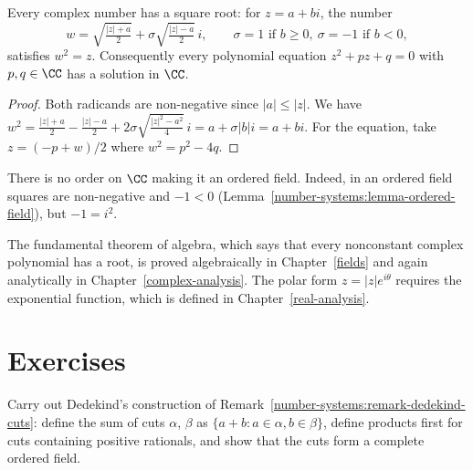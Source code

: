 \begin{proposition}\label{number-systems:proposition-complex-square-roots}
Every complex number has a square root: for $z = a + bi$, the number
\[
w = \sqrt{\tfrac{|z| + a}{2}} + \sigma \sqrt{\tfrac{|z| - a}{2}}\, i,
\qquad \sigma = 1 \text{ if } b \geq 0, \ \sigma = -1 \text{ if } b < 0,
\]
satisfies $w^2 = z$. Consequently every polynomial equation $z^2 + pz + q = 0$ with
$p, q \in \CC$ has a solution in $\CC$.
\end{proposition}

\begin{proof}
Both radicands are non-negative since $|a| \leq |z|$. We have
$w^2 = \frac{|z| + a}{2} - \frac{|z| - a}{2} + 2\sigma\sqrt{\frac{|z|^2 - a^2}{4}}\, i
= a + \sigma |b| i = a + bi$. For the equation, take
$z = (-p + w)/2$ where $w^2 = p^2 - 4q$.
\end{proof}

\begin{counterexample}\label{number-systems:counterexample-complex-not-ordered}
There is no order on $\CC$ making it an ordered field. Indeed, in an ordered
field squares are non-negative and $-1 < 0$
(Lemma~\ref{number-systems:lemma-ordered-field}), but $-1 = i^2$.
\end{counterexample}

\begin{remark}\label{number-systems:remark-complex-later}
The fundamental theorem of algebra, which says that every nonconstant complex
polynomial has a root, is proved algebraically in Chapter~\ref{fields} and again
analytically in Chapter~\ref{complex-analysis}. The polar form
$z = |z| e^{i\theta}$ requires the exponential function, which is defined in
Chapter~\ref{real-analysis}.
\end{remark}

\section{Exercises}\label{number-systems:section-exercises}

\begin{exercise}\label{number-systems:exercise-dedekind}
Carry out Dedekind's construction of Remark~\ref{number-systems:remark-dedekind-cuts}:
define the sum of cuts $\alpha$, $\beta$ as $\{a + b : a \in \alpha, b \in \beta\}$,
define products first for cuts containing positive rationals, and show that the
cuts form a complete ordered field.
\end{exercise}

